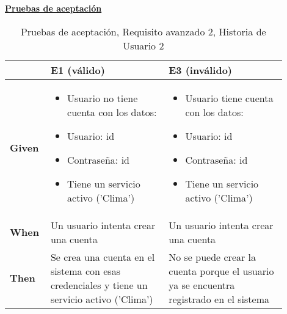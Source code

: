 \documentclass[../ei103948-project-documentation.tex]{subfiles}
\begin{document}
\begin{center}
								\textbf{\underline{Pruebas de aceptación}}
								\begin{table}[H]
									\centering
									\begin{tabular}{|p{0.10\linewidth}|p{0.40\linewidth}|p{0.40\linewidth}|}
										\hline
										& \textbf{E1 (válido)}                                                                        & \textbf{E3 (inválido)}                                                                 \\ \hline
						 \textbf{Given} & \begin{itemize}\vspace{-5mm}\setlength\itemsep{0mm}\setlength\parskip{0mm}\setlength{\itemindent}{-5mm}
							 \item Usuario no tiene cuenta con los datos:
							 \item Usuario: id
							 \item Contraseña: id
							 \item Tiene un servicio activo ('Clima')
						 \end{itemize}                                                                                   & \begin{itemize}\vspace{-5mm}\setlength\itemsep{0mm}\setlength\parskip{0mm}\setlength{\itemindent}{-5mm}
							 \item Usuario tiene cuenta con los datos:
							 \item Usuario: id
							 \item Contraseña: id
							 \item Tiene un servicio activo ('Clima')						 \end{itemize}                                                                               \\ \hline
						 \textbf{When}  & Un usuario intenta crear una cuenta                                                         & Un usuario intenta crear una cuenta                                                    \\ \hline
						 \textbf{Then}  & Se crea una cuenta en el sistema con esas credenciales y tiene un servicio activo ('Clima') & No se puede crear la cuenta porque el usuario ya se encuentra registrado en el sistema \\ \hline
						 \end{tabular}
									\caption{Pruebas de aceptación, Requisito avanzado 2, Historia de Usuario 2}
								\end{table}
								\end{center}
\end{document}
